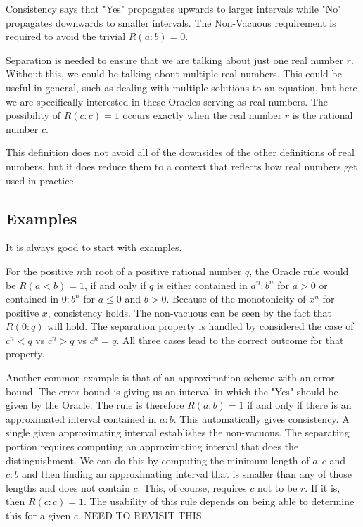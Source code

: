 \documentclass[12pt]{article}
\begin{document}
Consistency says that "Yes" propagates upwards to larger intervals while "No" propagates downwards to smaller intervals. The Non-Vacuous requirement is required to avoid the trivial $R(a:b) = 0$. 

Separation is needed to ensure that we are talking about just one real number $r$. Without this, we could be talking about multiple real numbers. This could be useful in general, such as dealing with multiple solutions to an equation, but here we are specifically interested in these Oracles serving as real numbers. The possibility of $R(c:c) = 1$ occurs exactly when the real number $r$ is the rational number $c$.

This definition does not avoid all of the downsides of the other definitions of real numbers, but it does reduce them to a context that reflects how real numbers get used in practice. 

\subsection{Examples}

It is always good to start with examples. 

For the positive $n$th root of a positive rational number $q$, the Oracle rule would be $R(a<b) = 1$, if and only if $q$ is either contained in $a^n:b^n$ for $a>0$ or contained in $0:b^n$ for $a \leq 0$ and $b>0$. Because of the monotonicity of $x^n$ for positive $x$, consistency holds. The non-vacuous can be seen by the fact that $R(0:q)$ will hold. The separation property is handled by considered the case of $c^n < q$ vs $c^n > q$ vs $c^n = q$. All three cases lead to the correct outcome for that property. 

Another common example is that of an approximation scheme with an error bound. The error bound is giving us an interval in which the "Yes" should be given by the Oracle. The rule is therefore $R(a:b) = 1$ if and only if there is an approximated interval contained in $a:b$. This automatically gives consistency. A single given approximating interval establishes the non-vacuous. The separating portion requires computing an approximating interval that does the distinguishment. We can do this by computing the minimum length of $a:c$ and $c:b$ and then finding an approximating interval that is smaller than any of those lengths and does not contain $c$. This, of course, requires $c$ not to be $r$. If it is, then $R(c:c) = 1$. The usability of this rule depends on being able to determine this for a given $c$. NEED TO REVISIT THIS. 
\end{document}

